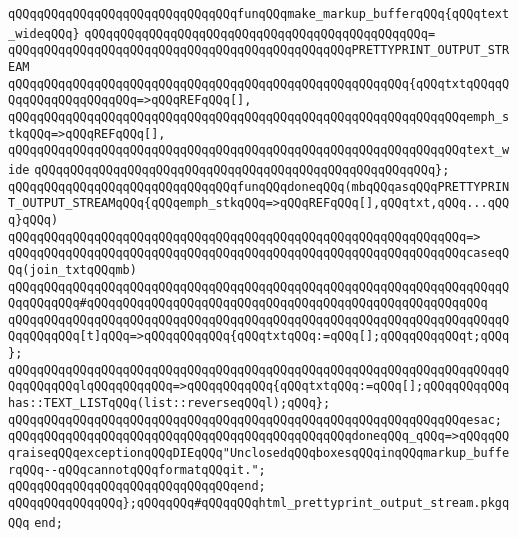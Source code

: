 \newline
\verb|qQQqqQQqqQQqqQQqqQQqqQQqqQQqqQQqfunqQQqmake_markup_bufferqQQq{qQQqtext_wideqQQq}|\newline
\verb|qQQqqQQqqQQqqQQqqQQqqQQqqQQqqQQqqQQqqQQqqQQqqQQq=|\newline
\verb|qQQqqQQqqQQqqQQqqQQqqQQqqQQqqQQqqQQqqQQqqQQqqQQqPRETTYPRINT_OUTPUT_STREAM|\newline
\verb|qQQqqQQqqQQqqQQqqQQqqQQqqQQqqQQqqQQqqQQqqQQqqQQqqQQqqQQq{qQQqtxtqQQqqQQqqQQqqQQqqQQqqQQq=>qQQqREFqQQq[],|\newline
\verb|qQQqqQQqqQQqqQQqqQQqqQQqqQQqqQQqqQQqqQQqqQQqqQQqqQQqqQQqqQQqqQQqemph_stkqQQq=>qQQqREFqQQq[],|\newline
\verb|qQQqqQQqqQQqqQQqqQQqqQQqqQQqqQQqqQQqqQQqqQQqqQQqqQQqqQQqqQQqqQQqtext_wide|\newline
\verb|qQQqqQQqqQQqqQQqqQQqqQQqqQQqqQQqqQQqqQQqqQQqqQQqqQQqqQQq};|\newline
\newline
\verb|qQQqqQQqqQQqqQQqqQQqqQQqqQQqqQQqfunqQQqdoneqQQq(mbqQQqasqQQqPRETTYPRINT_OUTPUT_STREAMqQQq{qQQqemph_stkqQQq=>qQQqREFqQQq[],qQQqtxt,qQQq...qQQq}qQQq)|\newline
\verb|qQQqqQQqqQQqqQQqqQQqqQQqqQQqqQQqqQQqqQQqqQQqqQQqqQQqqQQqqQQqqQQq=>|\newline
\verb|qQQqqQQqqQQqqQQqqQQqqQQqqQQqqQQqqQQqqQQqqQQqqQQqqQQqqQQqqQQqqQQqcaseqQQq(join_txtqQQqmb)|\newline
\verb|qQQqqQQqqQQqqQQqqQQqqQQqqQQqqQQqqQQqqQQqqQQqqQQqqQQqqQQqqQQqqQQqqQQqqQQqqQQqqQQq#qQQqqQQqqQQqqQQqqQQqqQQqqQQqqQQqqQQqqQQqqQQqqQQqqQQqqQQq|\newline
\verb|qQQqqQQqqQQqqQQqqQQqqQQqqQQqqQQqqQQqqQQqqQQqqQQqqQQqqQQqqQQqqQQqqQQqqQQqqQQqqQQq[t]qQQq=>qQQqqQQqqQQq{qQQqtxtqQQq:=qQQq[];qQQqqQQqqQQqt;qQQq};|\newline
\verb|qQQqqQQqqQQqqQQqqQQqqQQqqQQqqQQqqQQqqQQqqQQqqQQqqQQqqQQqqQQqqQQqqQQqqQQqqQQqqQQqlqQQqqQQqqQQq=>qQQqqQQqqQQq{qQQqtxtqQQq:=qQQq[];qQQqqQQqqQQqhas::TEXT_LISTqQQq(list::reverseqQQql);qQQq};|\newline
\verb|qQQqqQQqqQQqqQQqqQQqqQQqqQQqqQQqqQQqqQQqqQQqqQQqqQQqqQQqqQQqqQQqesac;|\newline
\newline
\verb|qQQqqQQqqQQqqQQqqQQqqQQqqQQqqQQqqQQqqQQqqQQqqQQqdoneqQQq_qQQq=>qQQqqQQqraiseqQQqexceptionqQQqDIEqQQq"UnclosedqQQqboxesqQQqinqQQqmarkup_bufferqQQq--qQQqcannotqQQqformatqQQqit.";|\newline
\verb|qQQqqQQqqQQqqQQqqQQqqQQqqQQqqQQqend;|\newline
\newline
\verb|qQQqqQQqqQQqqQQq};qQQqqQQq#qQQqqQQqhtml_prettyprint_output_stream.pkgqQQq|\newline
\verb|end;|\newline
\newline

